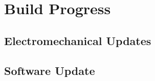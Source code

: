 
\section{Build Progress}
\label{sec:build_progress}


\subsection{Electromechanical Updates}
\label{sec:electromechanical_progress}


\subsection{Software Update}
\label{sec:software_progress}
